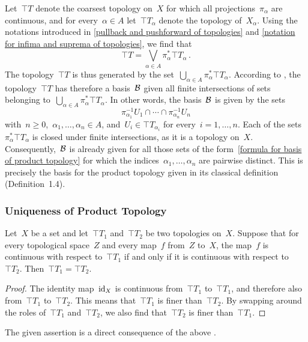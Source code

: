 Let~$\top{T}$ denote the coarsest topology on~$X$ for which all projections~$π_α$ are continuous, and for every~$α ∈ A$ let~$\top{T}_α$ denote the topology of~$X_α$.
Using the notations introduced in \cref{pullback and pushforward of topologies} and \cref{notation for infima and suprema of topologies}, we find that
\[
	\top{T} = ⋁_{α ∈ A} π_α^* \top{T}_α \,.
\]
The topology~$\top{T}$ is thus generated by the set~$⋃_{α ∈ A} π_α^* \top{T}_α$.
According to , the topology~$\top{T}$ has therefore a basis~$\mathcal{B}$ given all finite intersections of sets belonging to~$⋃_{α ∈ A} π_α^* \top{T}_α$.
In other words, the basis~$\mathcal{B}$ is given by the sets
\begin{equation}
	\label{formula for basis of product topology}
	π_{α_1}^{-1} U_1 ∩ \dotsb ∩ π_{α_n}^{-1} U_n
\end{equation}
with~$n ≥ 0$,~$α_1, \dotsc, α_n ∈ A$, and~$U_i ∈ \top{T}_{α_i}$ for every~$i = 1, \dotsc, n$.
Each of the sets~$π_α^* \top{T}_α$ is closed under finite intersections, as it is a topology on~$X$.
Consequently,~$\mathcal{B}$ is already given for all those sets of the form~\eqref{formula for basis of product topology} for which the indices~$α_1, \dotsc, α_n$ are pairwise distinct.
This is precisely the basis for the product topology given in its classical definition (Definition~1.4).



\subsubsection{Uniqueness of Product Topology}

\begin{proposition}
	\label{topology uniquely determined by ingoing maps}
	Let~$X$ be a set and let~$\top{T}_1$ and~$\top{T}_2$ be two topologies on~$X$.
	Suppose that for every topological space~$Z$ and every map~$f$ from~$Z$ to~$X$, the map~$f$ is continuous with respect to~$\top{T}_1$ if and only if it is continuous with respect to~$\top{T}_2$.
	Then~$\top{T}_1 = \top{T}_2$.
\end{proposition}

\begin{proof}
	The identity map~$\operatorname{id}_X$ is continuous from~$\top{T}_1$ to~$\top{T}_1$, and therefore also from~$\top{T}_1$ to~$\top{T}_2$.
	This means that~$\top{T}_1$ is finer than~$\top{T}_2$.
	By swapping around the roles of~$\top{T}_1$ and~$\top{T}_2$, we also find that~$\top{T}_2$ is finer than~$\top{T}_1$.
\end{proof}

The given assertion is a direct consequence of the above .
